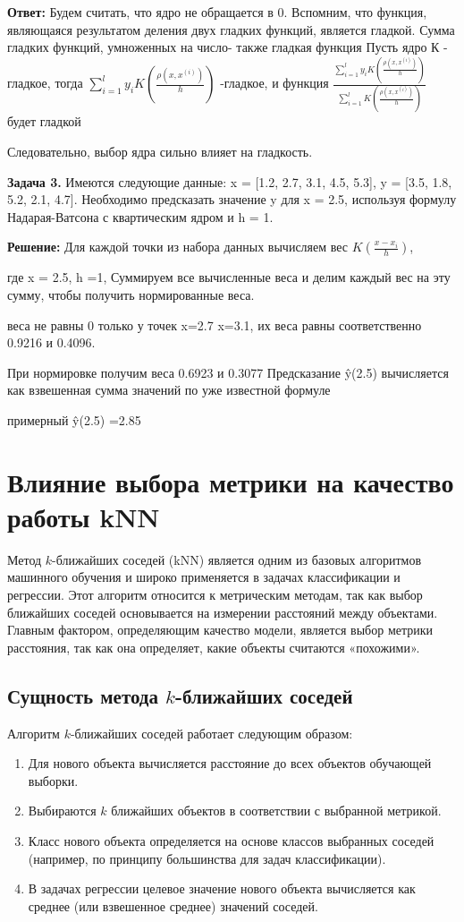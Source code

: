 \textbf{Ответ:}
Будем считать, что ядро не обращается в 0.
Вспомним, что функция, являющаяся результатом деления двух гладких функций, является гладкой.
Сумма гладких функций, умноженных на число- также гладкая функция
Пусть ядро К - гладкое, тогда ${\sum\limits_{i=1}^ly_iK\left(\frac{\rho(x, x^{(i)})}{h}\right)}$ -гладкое, и функция
$\frac{\sum\limits_{i=1}^ly_iK\left(\frac{\rho(x, x^{(i)})}{h}\right)}{\sum\limits_{i=1}^lK\left(\frac{\rho(x, x^{(i)})}{h}\right)}$
будет гладкой

Следовательно, выбор ядра сильно влияет на гладкость.

\textbf{Задача 3.} Имеются следующие данные: x = [1.2, 2.7, 3.1, 4.5, 5.3],  y = [3.5, 1.8, 5.2, 2.1, 4.7].  Необходимо предсказать значение y для x = 2.5, используя формулу Надарая-Ватсона с квартическим ядром и h = 1.


\textbf{Решение:} Для каждой точки из набора данных вычисляем вес $K(\frac{x-x_i}{h})$,

где x = 2.5, h =1,
Суммируем все вычисленные веса и делим каждый вес на эту сумму, чтобы получить нормированные веса.

веса не равны 0 только у точек x=2.7 x=3.1, их веса равны соответственно 0.9216 и 0.4096.

При нормировке получим веса 0.6923 и 0.3077
Предсказание ŷ(2.5) вычисляется как взвешенная сумма значений по уже известной формуле

примерный ŷ(2.5) =2.85


\section{Влияние выбора метрики на качество работы kNN}

Метод \(k\)-ближайших соседей (kNN) является одним из базовых алгоритмов машинного обучения и широко применяется в задачах классификации и регрессии. Этот алгоритм относится к метрическим методам, так как выбор ближайших соседей основывается на измерении расстояний между объектами. Главным фактором, определяющим качество модели, является выбор метрики расстояния, так как она определяет, какие объекты считаются «похожими».

\subsection{Сущность метода \(k\)-ближайших соседей}

Алгоритм \(k\)-ближайших соседей работает следующим образом:
\begin{enumerate}
    \item Для нового объекта вычисляется расстояние до всех объектов обучающей выборки.
    \item Выбираются \(k\) ближайших объектов в соответствии с выбранной метрикой.
    \item Класс нового объекта определяется на основе классов выбранных соседей (например, по принципу большинства для задач классификации).
    \item В задачах регрессии целевое значение нового объекта вычисляется как среднее (или взвешенное среднее) значений соседей.
\end{enumerate}

